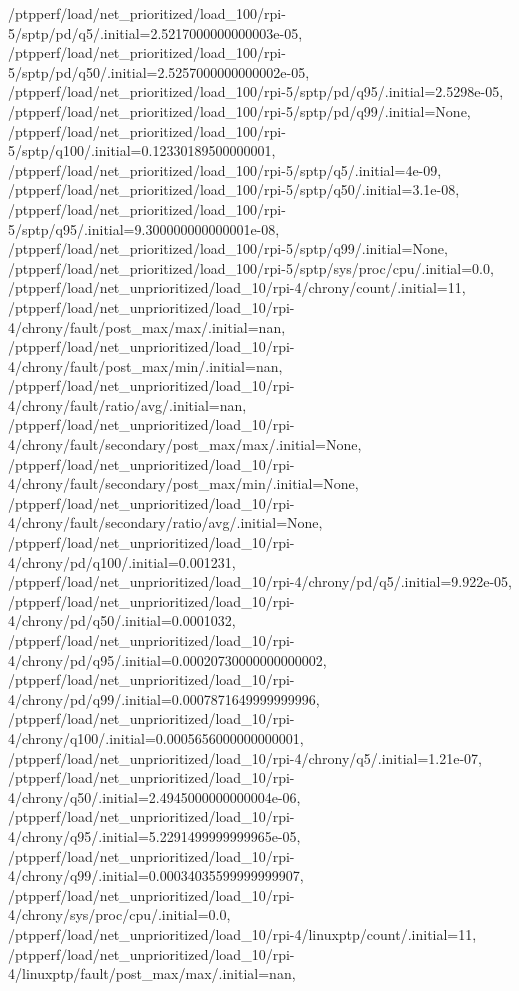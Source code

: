 {    /ptpperf/load/net_prioritized/load_100/rpi-5/sptp/pd/q5/.initial=2.5217000000000003e-05,
    /ptpperf/load/net_prioritized/load_100/rpi-5/sptp/pd/q50/.initial=2.5257000000000002e-05,
    /ptpperf/load/net_prioritized/load_100/rpi-5/sptp/pd/q95/.initial=2.5298e-05,
    /ptpperf/load/net_prioritized/load_100/rpi-5/sptp/pd/q99/.initial=None,
    /ptpperf/load/net_prioritized/load_100/rpi-5/sptp/q100/.initial=0.12330189500000001,
    /ptpperf/load/net_prioritized/load_100/rpi-5/sptp/q5/.initial=4e-09,
    /ptpperf/load/net_prioritized/load_100/rpi-5/sptp/q50/.initial=3.1e-08,
    /ptpperf/load/net_prioritized/load_100/rpi-5/sptp/q95/.initial=9.300000000000001e-08,
    /ptpperf/load/net_prioritized/load_100/rpi-5/sptp/q99/.initial=None,
    /ptpperf/load/net_prioritized/load_100/rpi-5/sptp/sys/proc/cpu/.initial=0.0,
    /ptpperf/load/net_unprioritized/load_10/rpi-4/chrony/count/.initial=11,
    /ptpperf/load/net_unprioritized/load_10/rpi-4/chrony/fault/post_max/max/.initial=nan,
    /ptpperf/load/net_unprioritized/load_10/rpi-4/chrony/fault/post_max/min/.initial=nan,
    /ptpperf/load/net_unprioritized/load_10/rpi-4/chrony/fault/ratio/avg/.initial=nan,
    /ptpperf/load/net_unprioritized/load_10/rpi-4/chrony/fault/secondary/post_max/max/.initial=None,
    /ptpperf/load/net_unprioritized/load_10/rpi-4/chrony/fault/secondary/post_max/min/.initial=None,
    /ptpperf/load/net_unprioritized/load_10/rpi-4/chrony/fault/secondary/ratio/avg/.initial=None,
    /ptpperf/load/net_unprioritized/load_10/rpi-4/chrony/pd/q100/.initial=0.001231,
    /ptpperf/load/net_unprioritized/load_10/rpi-4/chrony/pd/q5/.initial=9.922e-05,
    /ptpperf/load/net_unprioritized/load_10/rpi-4/chrony/pd/q50/.initial=0.0001032,
    /ptpperf/load/net_unprioritized/load_10/rpi-4/chrony/pd/q95/.initial=0.00020730000000000002,
    /ptpperf/load/net_unprioritized/load_10/rpi-4/chrony/pd/q99/.initial=0.0007871649999999996,
    /ptpperf/load/net_unprioritized/load_10/rpi-4/chrony/q100/.initial=0.0005656000000000001,
    /ptpperf/load/net_unprioritized/load_10/rpi-4/chrony/q5/.initial=1.21e-07,
    /ptpperf/load/net_unprioritized/load_10/rpi-4/chrony/q50/.initial=2.4945000000000004e-06,
    /ptpperf/load/net_unprioritized/load_10/rpi-4/chrony/q95/.initial=5.2291499999999965e-05,
    /ptpperf/load/net_unprioritized/load_10/rpi-4/chrony/q99/.initial=0.00034035599999999907,
    /ptpperf/load/net_unprioritized/load_10/rpi-4/chrony/sys/proc/cpu/.initial=0.0,
    /ptpperf/load/net_unprioritized/load_10/rpi-4/linuxptp/count/.initial=11,
    /ptpperf/load/net_unprioritized/load_10/rpi-4/linuxptp/fault/post_max/max/.initial=nan,
}
